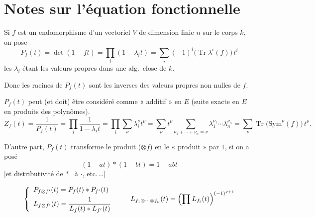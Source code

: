 \documentclass[11pt,a4paper]{article}
\begin{document}
\section{Notes sur l'équation fonctionnelle}

Si $f$ est un endomorphisme d'un vectoriel $V$ de dimension finie $n$ sur le
corps $k$, on pose
\[
  P_f(t) = \det(1 - f t) = \prod_i (1 - \lambda_i t)
         = \sum_i (-1)^i \bigl(\operatorname{Tr} \lambda^i(f)\bigr)\, t^i
\]
les $\lambda_i$ étant les valeurs propres dans une 
alg.\ close de $k$.

Donc les racines de $P_f(t)$ sont les inverses des valeurs propres non nulles
de $f$.

$P_f(t)$ peut (et doit) être considéré comme « additif » en $E$ (suite exacte
en $E$  en produits des polynômes). \ill{}
\[
  Z_f(t) = \frac{1}{P_f(t)} = \prod_i \frac{1}{1 - \lambda_i t}
         = \prod_i \sum_{\nu} \lambda_i^{\nu} t^{\nu}
         = \sum_{\nu} t^{\nu} \sum_{\nu_1 + \cdots + \nu_n = \nu}
             \lambda_1^{\nu_1} \cdots \lambda_n^{\nu_n}
         = \sum_{\nu} \operatorname{Tr}\bigl(\mathrm{Sym}^{\nu}(f)\bigr)\, t^{\nu} .
\]

D'autre part, $P_f(t)$ transforme le produit ($\otimes f$) en le « produit »
\ill{}  \ill{} par $1$, si on a posé
\[
  (1 - a t) * (1 - b t) = 1 - a b t
\]
[et distributivité de $*$ \ à $\cdot$, etc.\,\ldots]

\[
  \left\lbrace
  \begin{array}{l}
    P_{f \otimes f'}(t) = P_f(t) * P_{f'}(t) \\[4pt]
    L_{f \otimes f'}(t) = \dfrac{1}{L_f(t) * L_{f'}(t)}
  \end{array}
  \right.
  \qquad
  L_{f_1 \otimes \cdots \otimes f_{\nu}}(t)
    = \Bigl(\prod L_{f_i}(t)\Bigr)^{(-1)^{\nu+1}}
\]
\end{document}
